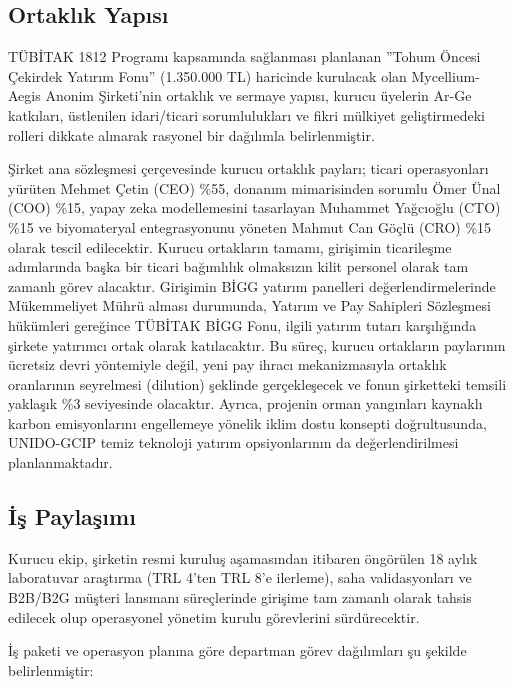\documentclass[11pt,a4paper]{article}
\begin{document}
\subsection{Ortaklık Yapısı}

TÜBİTAK 1812 Programı kapsamında sağlanması planlanan ''Tohum Öncesi Çekirdek Yatırım Fonu'' (1.350.000 TL) haricinde kurulacak olan Mycellium-Aegis Anonim Şirketi'nin ortaklık ve sermaye yapısı, kurucu üyelerin Ar-Ge katkıları, üstlenilen idari/ticari sorumlulukları ve fikri mülkiyet geliştirmedeki rolleri dikkate alınarak rasyonel bir dağılımla belirlenmiştir.

Şirket ana sözleşmesi çerçevesinde kurucu ortaklık payları; ticari operasyonları yürüten Mehmet Çetin (CEO) \%55, donanım mimarisinden sorumlu Ömer Ünal (COO) \%15, yapay zeka modellemesini tasarlayan Muhammet Yağcıoğlu (CTO) \%15 ve biyomateryal entegrasyonunu yöneten Mahmut Can Göçlü (CRO) \%15 olarak tescil edilecektir. Kurucu ortakların tamamı, girişimin ticarileşme adımlarında başka bir ticari bağımlılık olmaksızın kilit personel olarak tam zamanlı görev alacaktır. Girişimin BİGG yatırım panelleri değerlendirmelerinde Mükemmeliyet Mührü alması durumunda, Yatırım ve Pay Sahipleri Sözleşmesi hükümleri gereğince TÜBİTAK BİGG Fonu, ilgili yatırım tutarı karşılığında şirkete yatırımcı ortak olarak katılacaktır. Bu süreç, kurucu ortakların paylarının ücretsiz devri yöntemiyle değil, yeni pay ihracı mekanizmasıyla ortaklık oranlarının seyrelmesi (dilution) şeklinde gerçekleşecek ve fonun şirketteki temsili yaklaşık \%3 seviyesinde olacaktır. Ayrıca, projenin orman yangınları kaynaklı karbon emisyonlarını engellemeye yönelik iklim dostu konsepti doğrultusunda, UNIDO-GCIP temiz teknoloji yatırım opsiyonlarının da değerlendirilmesi planlanmaktadır.

\subsection{İş Paylaşımı}

Kurucu ekip, şirketin resmi kuruluş aşamasından itibaren öngörülen 18 aylık laboratuvar araştırma (TRL 4'ten TRL 8'e ilerleme), saha validasyonları ve B2B/B2G müşteri lansmanı süreçlerinde girişime tam zamanlı olarak tahsis edilecek olup operasyonel yönetim kurulu görevlerini sürdürecektir.

İş paketi ve operasyon planına göre departman görev dağılımları şu şekilde belirlenmiştir:
\end{document}

